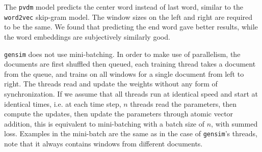 \documentclass{article}
\begin{document}
\begin{appendices}
The \texttt{pvdm} model predicts the center word instead of last word, similar to the \texttt{word2vec} skip-gram model. The window sizes on the left and right are required to be the same. We found that predicting the end word gave better results, while the word embeddings are subjectively similarly good.

\texttt{gensim} does not use mini-batching. In order to make use of parallelism, the documents are first shuffled then queued, each training thread takes a document from the queue, and trains on all windows for a single document from left to right. The threads read and update the weights without any form of synchronization. If we assume that all threads run at identical speed and start at identical times, i.e. at each time step, $n$ threads read the parameters, then compute the updates, then update the parameters through atomic vector addition, this is equivalent to mini-batching with a batch size of $n$, with summed loss. Examples in the mini-batch are the same as in the case of \texttt{gensim}'s threads, note that it always contains windows from different documents.

\end{appendices}

{}

\end{document}
